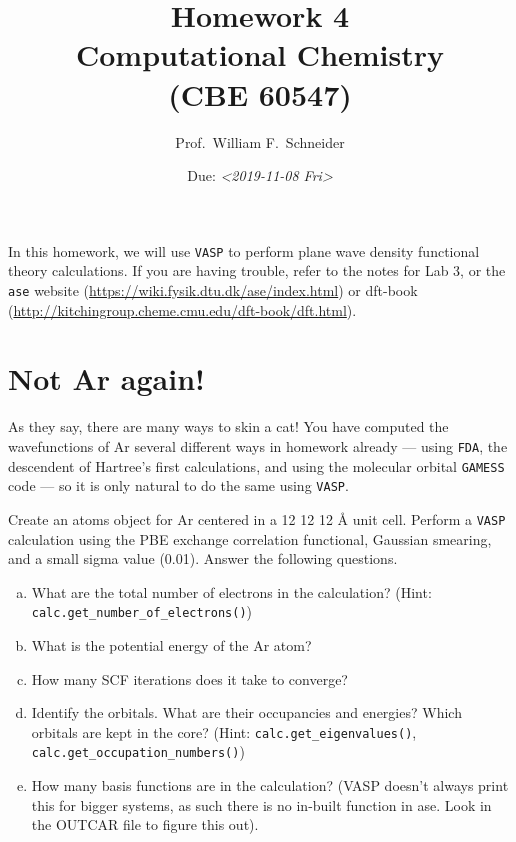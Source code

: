 \documentclass[11pt]{article}
\date{Due: \textit{<2019-11-08 Fri>}}
\title{}
\begin{document}
\title{Homework 4\\Computational Chemistry\\(CBE 60547)}
\author{Prof.\ William F.\ Schneider}
\maketitle


In this homework, we will use \texttt{VASP} to perform plane wave density functional theory calculations. If you are having trouble, refer to the notes for Lab 3, or the \texttt{ase} website (\url{https://wiki.fysik.dtu.dk/ase/index.html}) or dft-book (\url{http://kitchingroup.cheme.cmu.edu/dft-book/dft.html}).

\section{Not Ar again! \label{sec:Ar}}
\label{sec:orgae7d58b}

As they say, there are many ways to skin a cat! You have computed the wavefunctions of Ar several different ways in homework already — using \texttt{FDA}, the descendent of Hartree’s first calculations, and using the molecular orbital \texttt{GAMESS} code — so it is only natural to do the same using \texttt{VASP}. 

Create an atoms object for Ar centered in a 12 \texttimes{} 12 \texttimes{} 12 \AA{} unit cell. Perform a \texttt{VASP} calculation using the PBE exchange correlation functional, Gaussian smearing, and a small sigma value (0.01). Answer the following questions.

\begin{enumerate}[(a)]
\item What are the total number of electrons in the calculation? (Hint: \texttt{calc.get\_number\_of\_electrons()})

\item What is the potential energy of the Ar atom?

\item How many SCF iterations does it take to converge?

\item Identify the orbitals. What are their occupancies and energies? Which orbitals are kept in the core? (Hint: \texttt{calc.get\_eigenvalues()}, \texttt{calc.get\_occupation\_numbers()})

\item How many basis functions are in the calculation? (VASP doesn't always print this for bigger systems, as such there is no in-built function in ase. Look in the OUTCAR file to figure this out).
\end{enumerate}
\end{document}
